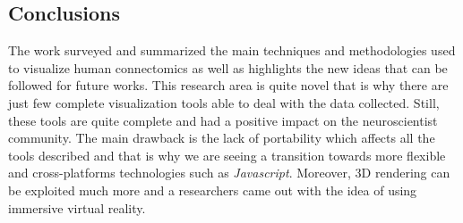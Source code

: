 \documentclass{article}
\begin{document}
\begin{multicols}{2}
\section{Conclusions}
\label{sec:conclusions}

The work surveyed and summarized the main techniques and methodologies used to visualize human connectomics as well as highlights the new ideas that can be followed for future works. This research area is quite novel that is why there are just few complete visualization tools able to deal with the data collected. Still, these tools are quite complete and had a positive impact on the neuroscientist community. The main drawback is the lack of portability which affects all the tools described and that is why we are seeing a transition towards more flexible and cross-platforms technologies such as \textit{Javascript}. Moreover, 3D rendering can be exploited much more and a researchers came out with the idea of using immersive virtual reality.


{}
  





\end{multicols}
\end{document}
